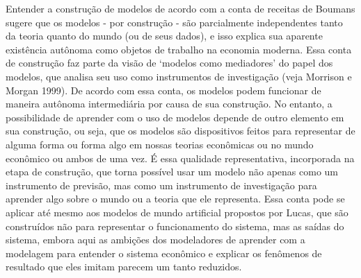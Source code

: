 \documentclass[a4paper,12pt]{article}[abntex2]
\begin{document}
Entender a construção de modelos de acordo com a conta de receitas de Boumans sugere que os modelos - por construção - são parcialmente independentes tanto da teoria quanto do mundo (ou de seus dados), e isso explica sua aparente existência autônoma como objetos de trabalho na economia moderna. Essa conta de construção faz parte da visão de ‘modelos como mediadores’ do papel dos modelos, que analisa seu uso como instrumentos de investigação (veja Morrison e Morgan 1999). De acordo com essa conta, os modelos podem funcionar de maneira autônoma intermediária por causa de sua construção. No entanto, a possibilidade de aprender com o uso de modelos depende de outro elemento em sua construção, ou seja, que os modelos são dispositivos feitos para representar de alguma forma ou forma algo em nossas teorias econômicas ou no mundo econômico ou ambos de uma vez. É essa qualidade representativa, incorporada na etapa de construção, que torna possível usar um modelo não apenas como um instrumento de previsão, mas como um instrumento de investigação para aprender algo sobre o mundo ou a teoria que ele representa. Essa conta pode se aplicar até mesmo aos modelos de mundo artificial propostos por Lucas, que são construídos não para representar o funcionamento do sistema, mas as saídas do sistema, embora aqui as ambições dos modeladores de aprender com a modelagem para entender o sistema econômico e explicar os fenômenos de resultado que eles imitam parecem um tanto reduzidos.
\end{document}
